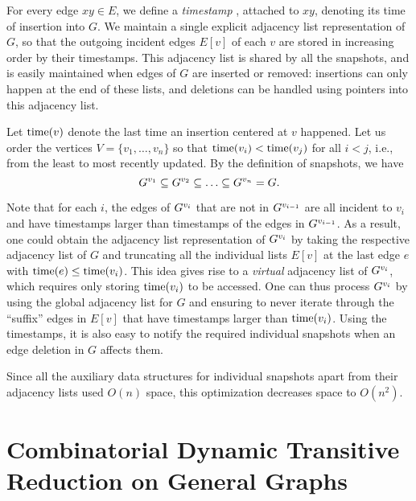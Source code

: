 \documentclass[11pt]{article}
\newcommand{\graph}[1]{\text{\( G^{#1} \)\xspace}}
\newcommand{\ts}[1]{\text{time\( ( #1 ) \)}\xspace}
\newcommand{\edge}[2]{\ensuremath{ #1 #2 }\xspace}
\begin{document}
{For every edge \( \edge{x}{y} \in E \), we define a \textit{timestamp} \ts{\edge{x}{y}}, attached to \edge{x}{y}, denoting its time of insertion into \( G \).
We maintain a single explicit adjacency list representation of $G$, so that the outgoing incident edges $E[v]$ of each $v$ are stored in increasing order by their timestamps. 
This adjacency list is shared by all the snapshots, and is easily maintained when edges of $G$ are inserted or removed: insertions can only happen at the end of these lists, and deletions can be handled using pointers into this adjacency list.

Let $\ts{v}$ denote the last time an insertion centered at $v$ happened.
Let us order the vertices $V=\{v_1,\ldots,v_n\}$ so that
$\ts{v_i}<\ts{v_j}$ for all $i<j$, i.e., from the least to most recently updated.
By the definition of snapshots,
we have
\[ \graph{v_1}\subseteq \graph{v_2}\subseteq \ldots \subseteq \graph{v_n}=G.\]

Note that for each $i$, the edges of $\graph{v_i}$ that are not in $\graph{v_{i-1}}$ are all incident to $v_i$ and have timestamps larger than timestamps of the edges in $\graph{v_{i-1}}$.
As a result, one could obtain the adjacency list representation of $\graph{v_i}$ by taking the respective adjacency list of $G$ and truncating all the individual lists $E[v]$ at the last edge $e$ with
$\ts{e}\leq \ts{v_i}$.
This idea gives rise to a \emph{virtual} adjacency list of $\graph{v_i}$, which requires only storing $\ts{v_i}$ to be accessed.
One can thus process $\graph{v_i}$ by using the global adjacency list for $G$ and ensuring to never iterate through the ``suffix'' edges in $E[v]$ that have timestamps larger than $\ts{v_i}$.
Using the timestamps, it is also easy to notify the required individual snapshots when an edge deletion in $G$ affects them.

Since all the auxiliary data structures for individual snapshots apart from their adjacency lists used $O(n)$ space, this optimization decreases space to $O(n^2)$.













 \section{Combinatorial Dynamic Transitive Reduction on General Graphs} \label{subsec:combinatorial_general}


}
\end{document}
